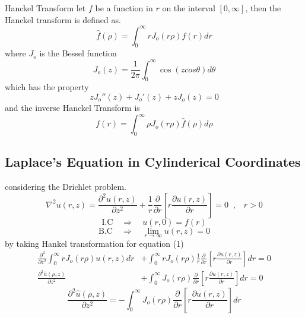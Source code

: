 \documentclass[]{article}
\begin{document}
\begin{enrichment*}{Hanckel Transform}
    let $f$ be a function in $r$ on the interval $[0,\infty]$, then the Hanckel transform is defined as.
    \[
        \hat{f}(\rho) = \int_{0}^{\infty} r J_o(r\rho) f(r) dr    
    \]
    where $J_o$ is the Bessel function 
    \[
        J_o(z) = \frac{1}{2\pi}\int_{0}^{\infty} \cos(zcos\theta)d\theta     
    \]
    which has the property 
    \[
        z J_o''(z) + J_o'(z)+ zJ_o(z) = 0     
    \]
    and the inverse Hanckel Transform is 
    \[
        f(r) = \int_{0}^{\infty} \rho J_o(r\rho) \hat{f}(\rho) d\rho    
    \]
\end{enrichment*}
\setcounter{equation}{0}
\subsection{Laplace's Equation in Cylinderical Coordinates}
considering the Drichlet problem.
\begin{equation}
\nabla^2 u(r,z) = \frac{\partial^2 u(r,z)}{\partial z^2} + \frac{1}{r}\frac{\partial}{\partial r}\left[r\frac{\partial u(r,z)}{\partial r}\right] = 0 \;\; , \;\;\; r >0
\end{equation}
\begin{equation}
\text{I.C} \quad \Longrightarrow \quad u(r,0) = f(r)
\end{equation}
\begin{equation}
\text{B.C} \quad \Longrightarrow \quad \lim_{r\rightarrow\infty} u(r,z) =0
\end{equation}
by taking Hankel transformation for equation (1) 
\begin{align*}
\frac{\partial^2 }{\partial z^2}\int_{0}^{\infty} rJ_o(r\rho)u(r,z) dr &+ \int_{0}^{\infty}rJ_o(r\rho)\frac{1}{r}\frac{\partial}{\partial r}\left[r\frac{\partial u(r,z)}{\partial r}\right]dr = 0
\\
\frac{\partial^2 \hat{u}(\rho,z)}{\partial z^2} &+ \int_{0}^{\infty}J_o(r\rho)\frac{\partial}{\partial r}\left[r\frac{\partial u(r,z)}{\partial r}\right]dr = 0
\end{align*}
\begin{equation}
\frac{\partial^2 \hat{u}(\rho,z)}{\partial z^2}  = -\int_{0}^{\infty}J_o(r\rho)\frac{\partial}{\partial r}\left[r\frac{\partial u(r,z)}{\partial r}\right]dr
\end{equation}

\newpage 
\end{document}

